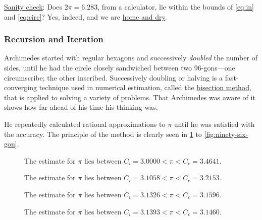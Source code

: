 \documentclass[
  a4paper,
]{article}
\begin{document}
\href{https://en.wiktionary.org/wiki/sanity_check}{Sanity check}: Does
\(2\pi = 6.283\), from a calculator, lie within the bounds of
\cref{eq:in} and \cref{eq:circ}? Yes, indeed, and we are
\href{https://dictionary.cambridge.org/dictionary/english/be-home-and-dry}{home
and dry}.

\subsubsection{Recursion and Iteration}\label{recursion-and-iteration}

Archimedes started with regular hexagons and successively \emph{doubled}
the number of sides, until he had the circle closely sandwiched between
two 96-gons---one circumscribe; the other inscribed. Successively
doubling or halving is a fast-converging technique used in numerical
estimation, called the
\href{https://en.wikipedia.org/wiki/Bisection_method}{bisection method},
that is applied to solving a variety of problems. That Archimedes was
aware of it shows how far ahead of his time his thinking was.

He repeatedly calculated rational approximations to \(\pi\) until he was
satisfied with the accuracy. The principle of the method is clearly seen
in \cref{fig:six-gon} to \cref{fig:ninety-six-gon}.

\begin{figure}
\centering

\caption{The estimate for \(\pi\) lies between
\(C_i = 3.0000 < \pi < C_c = 3.4641\).}\label{fig:six-gon}
\end{figure}

\begin{figure}
\centering

\caption{The estimate for \(\pi\) lies between
\(C_i = 3.1058 < \pi < C_c = 3.2153\).}\label{fig:twelve-gon}
\end{figure}

\begin{figure}
\centering

\caption{The estimate for \(\pi\) lies between
\(C_i = 3.1326 < \pi < C_c = 3.1596\).}\label{fig:twenty-four-gon}
\end{figure}

\begin{figure}
\centering

\caption{The estimate for \(\pi\) lies between
\(C_i = 3.1393 < \pi < C_c = 3.1460\).}\label{fig:forty-eight-gon}
\end{figure}
\end{document}
